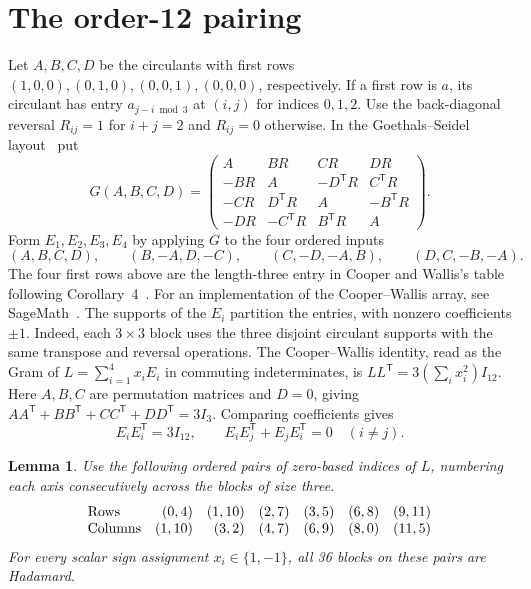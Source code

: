 \documentclass[10pt]{article}
\newtheorem{lemma}[theorem]{Lemma}
\newcommand{\tr}{^{\mathsf T}}
\begin{document}
\section{The order-12 pairing}

Let $A,B,C,D$ be the circulants with first rows $(1,0,0),(0,1,0),(0,0,1),(0,0,0)$, respectively. If a first row is $a$, its circulant has entry $a_{j-i\bmod 3}$ at $(i,j)$ for indices $0,1,2$. Use the back-diagonal reversal $R_{ij}=1$ for $i+j=2$ and $R_{ij}=0$ otherwise. In the Goethals--Seidel layout~\cite{GS70} put
\[
G(A,B,C,D)=
\begin{pmatrix}
 A & BR & CR & DR\\
 -BR & A & -D\tr R & C\tr R\\
 -CR & D\tr R & A & -B\tr R\\
 -DR & -C\tr R & B\tr R & A
\end{pmatrix}.
\]
Form $E_1,E_2,E_3,E_4$ by applying $G$ to the four ordered inputs
\[
(A,B,C,D),\qquad(B,-A,D,-C),\qquad(C,-D,-A,B),\qquad(D,C,-B,-A).
\]
The four first rows above are the length-three entry in Cooper and Wallis's table following Corollary~4~\cite{CW72}. For an implementation of the Cooper--Wallis array, see SageMath~\cite{Sage}. The supports of the $E_i$ partition the entries, with nonzero coefficients $\pm1$. Indeed, each $3\times3$ block uses the three disjoint circulant supports with the same transpose and reversal operations. The Cooper--Wallis identity, read as the Gram of $L=\sum_{i=1}^4 x_i E_i$ in commuting indeterminates, is $LL\tr=3(\sum_i x_i^2)I_{12}$. Here $A,B,C$ are permutation matrices and $D=0$, giving $AA\tr+BB\tr+CC\tr+DD\tr=3I_3$. Comparing coefficients gives
\begin{equation}\label{eq:design}
E_iE_i\tr=3I_{12},\qquad E_iE_j\tr+E_jE_i\tr=0\quad (i\ne j).
\end{equation}

\begin{lemma}\label{lem:pairing}
Use the following ordered pairs of zero-based indices of $L$, numbering each axis consecutively across the blocks of size three.
\[
\begin{array}{@{}lrrrrrr@{}}
\text{Rows} &(0,4)&(1,10)&(2,7)&(3,5)&(6,8)&(9,11)\\
\text{Columns} &(1,10)&(3,2)&(4,7)&(6,9)&(8,0)&(11,5)
\end{array}
\]
For every scalar sign assignment $x_i\in\{1,-1\}$, all 36 blocks on these pairs are Hadamard.
\end{lemma}
\end{document}
